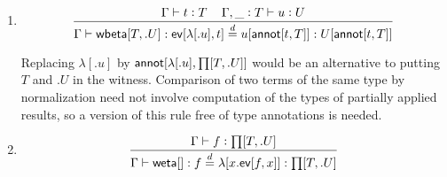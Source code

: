 \documentclass[11pt]{article}
\newcommand{\eqd}{\stackrel{d}{=}}
\newcommand{\spc}{{\,\,\,\,\,\,\,}}
\newcommand{\ccolon}[1]{\vcentcolon#1}
\newcommand{\synth}[1]{\vcentcolon(\Rightarrow#1)} %
\newcommand{\ccheck}[1]{\vcentcolon#1}  %
\newcommand{\ha}[2]{#1[#2]}
\newcommand{\weta}{{\sf weta}}
\newcommand{\annot}{{\sf annot}}
\newcommand{\ev}{{\sf ev}}
\newcommand{\wbeta}{{\sf wbeta}}
\newcommand{\var}{\char`_}
\begin{document}
\begin{enumerate}
For simplicity, assume that $f'$ is $f$, and observe that $\Gamma \vdash
\ha\ev{f',t'} \synth{U[\ha\annot{t,T}]}$ may not be valid, even though $\Gamma
\vdash \ha\ev{f',t'} \synth{U[\ha\annot{t',T}]}$ is.  Nevertheless, $\Gamma \vdash
\ha\ev{f',t'} : U[\ha\annot{t,T}]$ is valid in the underlying type theory where
the witnesses have been forgotten.

\item 
$$\frac{ \Gamma\vdash t \ccheck{T}\spc \Gamma, \var \ccolon{T}\vdash u \ccheck{U}}{\Gamma\vdash \ha\wbeta{T,.U} : \ha\ev{\ha\lambda{.u},t} \eqd u[\ha\annot{t,T}] : U[\ha\annot{t,T}]}$$

Replacing $\ha\lambda{.u}$ by $\ha\annot{\ha\lambda{.u},\ha\prod{T,.U}}$ would
be an alternative to putting $T$ and $.U$ in the witness.  Comparison of two
terms of the same type by normalization need not involve computation of the
types of partially applied results, so a version of this rule free of type
annotations is needed.

\item 
$$\frac{\Gamma\vdash f \ccheck{\ha\prod{T,.U}}}{\Gamma\vdash \ha\weta{} : f \eqd \ha\lambda{x.\ha\ev{f,x}} : \ha\prod{T,.U}}$$ 

\end{enumerate}



\end{document}
